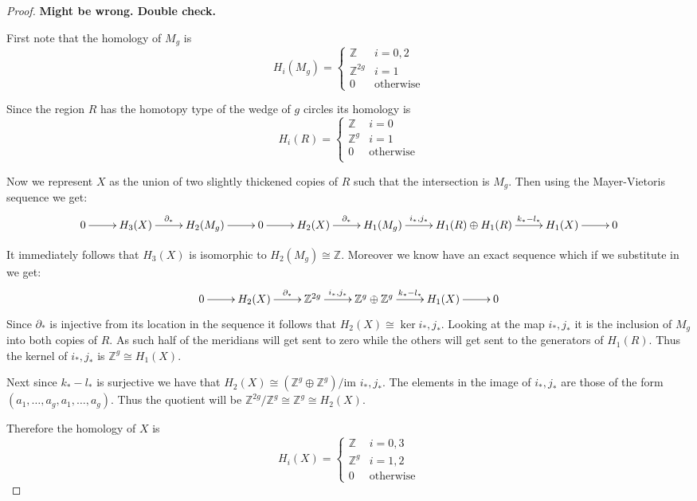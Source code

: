 \documentclass[10pt]{article}
\newcommand{\bb}[1]{\mathbb{#1}}
\theoremstyle{plain}
\theoremstyle{remark}
\begin{document}
\begin{proof}
  \textbf{Might be wrong. Double check.}
  
  First note that the homology of $M_g$ is
  \[
    H_i(M_g) = 
    \left\{
      \begin{array}{cr}
        \bb{Z} & i=0,2\\
        \bb{Z}^{2g} & i=1\\
        0 & \text{otherwise}
      \end{array}
    \right.
  \]

  Since the region $R$ has the homotopy type of the wedge of $g$ circles
  its homology is
  \[
    H_i(R) = 
    \left\{
      \begin{array}{cr}
        \bb{Z} & i=0\\
        \bb{Z}^g & i=1\\
        0 & \text{otherwise}\\
      \end{array}
    \right.
  \]

  Now we represent $X$ as the union of two slightly thickened copies
  of $R$ such that the intersection is $M_g$. Then using the Mayer-Vietoris
  sequence we get:
  \[
    \xymatrix{
      0 \ar[r] & H_3(X) \ar[r]^-{\partial_*} & H_2(M_g) \ar[r] & 0 \ar[r] & H_2(X) \ar[r]^-{\partial_*} & H_1(M_g) \ar[r]^-{i_*,j_*} & H_1(R)\oplus H_1(R) \ar[r]^-{k_*-l_*} & H_1(X) \ar[r] & 0
    }
  \]

  It immediately follows that $H_3(X)$ is isomorphic to $H_2(M_g)\cong \bb{Z}$. Moreover we know
  have an exact sequence which if we substitute in we get:
  \[
    \xymatrix{
      0 \ar[r] & H_2(X) \ar[r]^-{\partial_*} & \bb{Z}^{2g} \ar[r]^-{i_*,j_*} & \bb{Z}^g \oplus \bb{Z}^g \ar[r]^-{k_*-l_*} & H_1(X) \ar[r] & 0
    }
  \]
  Since $\partial_*$ is injective from its location in the sequence it follows that
  $H_2(X)\cong\ker i_*,j_*$. Looking at the map $i_*,j_*$ it is the inclusion of $M_g$ into both
  copies of $R$. As such half of the meridians will get sent to zero while the others will
  get sent to the generators of $H_1(R)$. Thus the kernel of $i_*,j_*$ is $\bb{Z}^g\cong H_1(X)$.

  Next since $k_*-l_*$ is surjective we have that $H_2(X)\cong(\bb{Z}^g\oplus\bb{Z}^g)/\text{im\ }i_*,j_*$.
  The elements in the image of $i_*,j_*$ are those of the form $(a_1,\ldots,a_g,a_1,\ldots,a_g)$.
  Thus the quotient will be $\bb{Z}^{2g}/\bb{Z}^g\cong\bb{Z}^g\cong H_2(X)$.

  Therefore the homology of $X$ is
  \[
    H_i(X) = 
    \left\{
      \begin{array}{cr}
        \bb{Z} & i=0,3\\
        \bb{Z}^g & i=1,2\\
        0 & \text{otherwise}
      \end{array}
    \right.
  \]


\end{proof}
\end{document}
